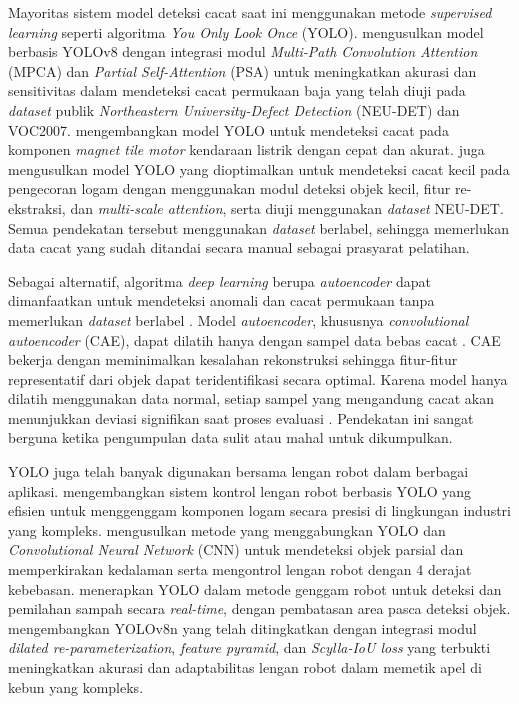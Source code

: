 Mayoritas sistem model deteksi cacat saat ini menggunakan metode
\textit{supervised learning} seperti algoritma \textit{You Only Look
Once} (YOLO). \citet{29} mengusulkan model berbasis YOLOv8 dengan
integrasi modul \textit{Multi-Path Convolution Attention} (MPCA) dan
\textit{Partial Self-Attention} (PSA) untuk meningkatkan akurasi dan
sensitivitas dalam mendeteksi cacat permukaan baja yang telah diuji pada
\textit{dataset} publik \textit{Northeastern University-Defect Detection}
(NEU-DET) dan VOC2007. \citet{30} mengembangkan model YOLO untuk
mendeteksi cacat
pada komponen \textit{magnet tile motor} kendaraan listrik dengan cepat dan
akurat. \citet{31} juga mengusulkan model YOLO yang dioptimalkan
untuk mendeteksi cacat kecil pada pengecoran logam dengan
menggunakan modul deteksi objek kecil, fitur re-ekstraksi, dan
\textit{multi-scale attention}, serta diuji menggunakan \textit{dataset}
NEU-DET. Semua pendekatan tersebut menggunakan \textit{dataset}
berlabel, sehingga memerlukan data cacat yang sudah ditandai secara
manual sebagai prasyarat pelatihan.

Sebagai alternatif, algoritma \textit{deep learning} berupa
\textit{autoencoder} dapat dimanfaatkan untuk mendeteksi anomali dan
cacat permukaan tanpa memerlukan \textit{dataset} berlabel \citep{7}.
Model \textit{autoencoder}, khususnya \textit{convolutional
autoencoder} (CAE), dapat dilatih hanya dengan sampel data bebas cacat
\citep{8}. CAE bekerja dengan meminimalkan kesalahan rekonstruksi
sehingga fitur-fitur representatif dari objek dapat teridentifikasi
secara optimal. Karena model hanya dilatih menggunakan data normal,
setiap sampel yang mengandung cacat akan menunjukkan deviasi
signifikan saat proses evaluasi \citep{9}. Pendekatan ini sangat
berguna ketika pengumpulan data sulit atau mahal untuk dikumpulkan.

YOLO juga telah banyak digunakan bersama lengan robot dalam berbagai
aplikasi. \citet{10} mengembangkan sistem kontrol
lengan robot berbasis YOLO yang efisien untuk menggenggam
komponen logam secara presisi di lingkungan industri yang kompleks.
\citet{11} mengusulkan metode yang menggabungkan YOLO dan
\textit{Convolutional Neural Network} (CNN) untuk mendeteksi objek
parsial dan memperkirakan kedalaman serta mengontrol lengan robot
dengan 4 derajat kebebasan. \citet{12} menerapkan YOLO dalam metode
genggam robot untuk deteksi dan pemilahan sampah secara
\textit{real-time}, dengan pembatasan area pasca deteksi
objek. \citet{13} mengembangkan YOLOv8n yang
telah ditingkatkan dengan integrasi modul \textit{dilated
re-parameterization}, \textit{feature pyramid}, dan
\textit{Scylla-IoU loss} yang terbukti meningkatkan akurasi dan
adaptabilitas lengan robot dalam memetik apel di kebun yang kompleks.

